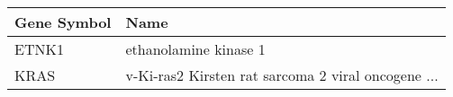 \begin{tabular}{ll}
\toprule
Gene Symbol &                                               Name \\
\midrule
      ETNK1 &                              ethanolamine kinase 1 \\
       KRAS & v-Ki-ras2 Kirsten rat sarcoma 2 viral oncogene ... \\
\bottomrule
\end{tabular}
